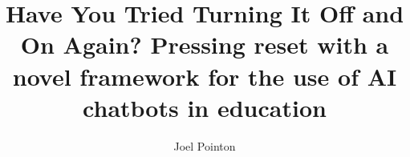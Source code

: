 \documentclass[a4paper2pt,twoside]{report}
\begin{document}
\let\cleardoublepage\clearpage %
\title{Have You Tried Turning It Off and On Again? Pressing reset with a novel framework for the use of AI chatbots in education} %

\author{Joel Pointon}

\normallinespacing
\maketitle


\preface
\let\cleardoublepage\clearpage




\body







% 





\clearpage
\printglossary[type=\acronymtype]
\printglossary
\end{document}
